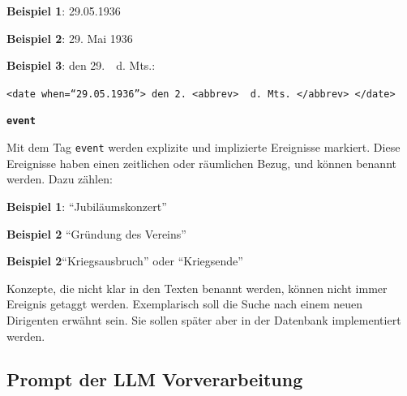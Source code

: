 \documentclass[12pt, a4paper, ngerman, bidi=default]{article}
\newcommand{\code}[1]{\colorbox{VeryLightGray}{\texttt{#1}}} %
\begin{document}
\begin{description}
    \noindent \textbf{ Beispiel 1}:  29.05.1936

    \textbf{ Beispiel 2}: 29. Mai 1936

    \textbf{ Beispiel 3}: den 29.\ \  d. Mts.:

    \code{\string<date when=\enquote{29.05.1936}>~den 2.~<abbrev>\ \ d. Mts.~</abbrev> </date>}


    \item\texttt{\textbf{{\colorbox{eventTag}{event}}}}
    
    Mit dem Tag \texttt{\colorbox{eventTag}{event}} werden explizite und implizierte Ereignisse markiert. Diese Ereignisse haben einen zeitlichen oder räumlichen Bezug, und können benannt werden. Dazu zählen:

    \noindent \textbf{ Beispiel 1}: \enquote{Jubiläumskonzert}

    \textbf{ Beispiel 2} \enquote{Gründung des Vereins} 

    \textbf{ Beispiel 2}\enquote{Kriegsausbruch} oder \enquote{Kriegsende}

    Konzepte, die nicht klar in den Texten benannt werden, können nicht immer Ereignis getaggt werden. Exemplarisch soll die Suche nach einem neuen Dirigenten erwähnt sein. Sie sollen später aber in der Datenbank implementiert werden.
    \end{description}


\subsection{Prompt der LLM Vorverarbeitung}\label{subsec:LLM-Promt}
\end{document}
